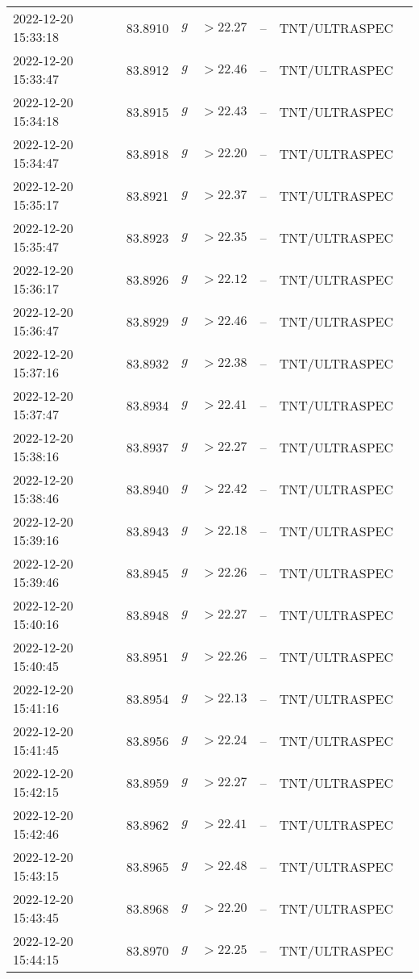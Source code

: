 \documentclass{nature_plusfigure}
\begin{document}
\begin{supplement}
\begin{center}
\begin{longtable}{lllllll}
2022-12-20 15:33:18 & 83.8910 & $g$ & $>22.27$ & -- & TNT/ULTRASPEC &  \\ 
2022-12-20 15:33:47 & 83.8912 & $g$ & $>22.46$ & -- & TNT/ULTRASPEC &  \\ 
2022-12-20 15:34:18 & 83.8915 & $g$ & $>22.43$ & -- & TNT/ULTRASPEC &  \\ 
2022-12-20 15:34:47 & 83.8918 & $g$ & $>22.20$ & -- & TNT/ULTRASPEC &  \\ 
2022-12-20 15:35:17 & 83.8921 & $g$ & $>22.37$ & -- & TNT/ULTRASPEC &  \\ 
2022-12-20 15:35:47 & 83.8923 & $g$ & $>22.35$ & -- & TNT/ULTRASPEC &  \\ 
2022-12-20 15:36:17 & 83.8926 & $g$ & $>22.12$ & -- & TNT/ULTRASPEC &  \\ 
2022-12-20 15:36:47 & 83.8929 & $g$ & $>22.46$ & -- & TNT/ULTRASPEC &  \\ 
2022-12-20 15:37:16 & 83.8932 & $g$ & $>22.38$ & -- & TNT/ULTRASPEC &  \\ 
2022-12-20 15:37:47 & 83.8934 & $g$ & $>22.41$ & -- & TNT/ULTRASPEC &  \\ 
2022-12-20 15:38:16 & 83.8937 & $g$ & $>22.27$ & -- & TNT/ULTRASPEC &  \\ 
2022-12-20 15:38:46 & 83.8940 & $g$ & $>22.42$ & -- & TNT/ULTRASPEC &  \\ 
2022-12-20 15:39:16 & 83.8943 & $g$ & $>22.18$ & -- & TNT/ULTRASPEC &  \\ 
2022-12-20 15:39:46 & 83.8945 & $g$ & $>22.26$ & -- & TNT/ULTRASPEC &  \\ 
2022-12-20 15:40:16 & 83.8948 & $g$ & $>22.27$ & -- & TNT/ULTRASPEC &  \\ 
2022-12-20 15:40:45 & 83.8951 & $g$ & $>22.26$ & -- & TNT/ULTRASPEC &  \\ 
2022-12-20 15:41:16 & 83.8954 & $g$ & $>22.13$ & -- & TNT/ULTRASPEC &  \\ 
2022-12-20 15:41:45 & 83.8956 & $g$ & $>22.24$ & -- & TNT/ULTRASPEC &  \\ 
2022-12-20 15:42:15 & 83.8959 & $g$ & $>22.27$ & -- & TNT/ULTRASPEC &  \\ 
2022-12-20 15:42:46 & 83.8962 & $g$ & $>22.41$ & -- & TNT/ULTRASPEC &  \\ 
2022-12-20 15:43:15 & 83.8965 & $g$ & $>22.48$ & -- & TNT/ULTRASPEC &  \\ 
2022-12-20 15:43:45 & 83.8968 & $g$ & $>22.20$ & -- & TNT/ULTRASPEC &  \\ 
2022-12-20 15:44:15 & 83.8970 & $g$ & $>22.25$ & -- & TNT/ULTRASPEC &  \\ 

\end{longtable}
\end{center}
\end{supplement}
\end{document}

